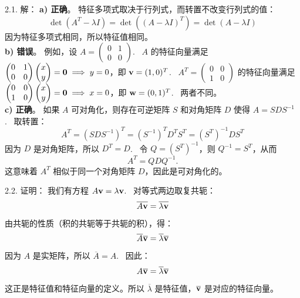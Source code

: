 \begin{exer}
\vspace{5ex}

2.1. 解：
\textbf{a) 正确}。
特征多项式取决于行列式，而转置不改变行列式的值：
$$ \det(A^T - \lambda I) = \det((A - \lambda I)^T) = \det(A - \lambda I) $$
因为特征多项式相同，所以特征值相同。
\\
\textbf{b) 错误}。
例如，设 $A = \begin{pmatrix} 0 & 1 \\ 0 & 0 \end{pmatrix}$.~
$A$ 的特征向量满足 $\begin{pmatrix} 0 & 1 \\ 0 & 0 \end{pmatrix} \begin{pmatrix} x \\ y \end{pmatrix} = \mathbf{0} \implies y=0$，即 $\mathbf{v} = (1, 0)^T$.~
$A^T = \begin{pmatrix} 0 & 0 \\ 1 & 0 \end{pmatrix}$ 的特征向量满足 $\begin{pmatrix} 0 & 0 \\ 1 & 0 \end{pmatrix} \begin{pmatrix} x \\ y \end{pmatrix} = \mathbf{0} \implies x=0$，即 $\mathbf{w} = (0, 1)^T$.~
两者不同。
\\
\textbf{c) 正确}。
如果 $A$ 可对角化，则存在可逆矩阵 $S$ 和对角矩阵 $D$ 使得 $A = SDS^{-1}$.~
取转置：
$$ A^T = (SDS^{-1})^T = (S^{-1})^T D^T S^T = (S^T)^{-1} D S^T $$
因为 $D$ 是对角矩阵，所以 $D^T = D$.~
令 $Q=(S^T)^{-1}$，则 $Q^{-1}=S^T$，从而
$$A^T=QDQ^{-1}.$$
这意味着 $A^T$ 相似于同一个对角矩阵 $D$，因此是可对角化的。

2.2. 证明：
我们有方程 $A\mathbf{v} = \lambda \mathbf{v}$.~
对等式两边取复共轭：
$$ \overline{A\mathbf{v}} = \overline{\lambda \mathbf{v}} $$
由共轭的性质（积的共轭等于共轭的积），得：
$$ \overline{A} \overline{\mathbf{v}} = \overline{\lambda} \overline{\mathbf{v}} $$
因为 $A$ 是实矩阵，所以 $\overline{A} = A$.~
因此：
$$ A \overline{\mathbf{v}} = \overline{\lambda} \overline{\mathbf{v}} $$
这正是特征值和特征向量的定义。所以 $\overline{\lambda}$ 是特征值，$\overline{\mathbf{v}}$ 是对应的特征向量。


\end{exer}
